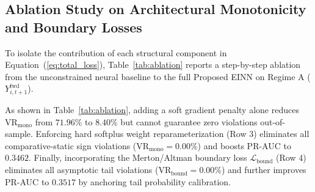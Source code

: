 \documentclass[11pt,a4paper]{article}
\begin{document}
\subsection{Ablation Study on Architectural Monotonicity and Boundary Losses}
To isolate the contribution of each structural component in Equation~(\ref{eq:total_loss}), Table~\ref{tab:ablation} reports a step-by-step ablation from the unconstrained neural baseline to the full Proposed EINN on Regime A ($Y_{i,t+1}^{\text{fwd}}$).

\begin{table}[t!]
\centering
\caption{Ablation study of structural components in Proposed EINN on the out-of-time test cohort ($Y_{i,t+1}^{\text{fwd}}$, $N_{\text{test}}=2,083$).}
\label{tab:ablation}
\footnotesize
\renewcommand{\arraystretch}{1.15}
\vspace{-0.4em}
\end{table}

As shown in Table~\ref{tab:ablation}, adding a soft gradient penalty alone reduces $\text{VR}_{\text{mono}}$ from $71.96\%$ to $8.40\%$ but cannot guarantee zero violations out-of-sample. Enforcing hard softplus weight reparameterization (Row 3) eliminates all comparative-static sign violations ($\text{VR}_{\text{mono}} = 0.00\%$) and boosts PR-AUC to $0.3462$. Finally, incorporating the Merton/Altman boundary loss $\mathcal{L}_{\text{bound}}$ (Row 4) eliminates all asymptotic tail violations ($\text{VR}_{\text{bound}} = 0.00\%$) and further improves PR-AUC to $0.3517$ by anchoring tail probability calibration.
\end{document}
